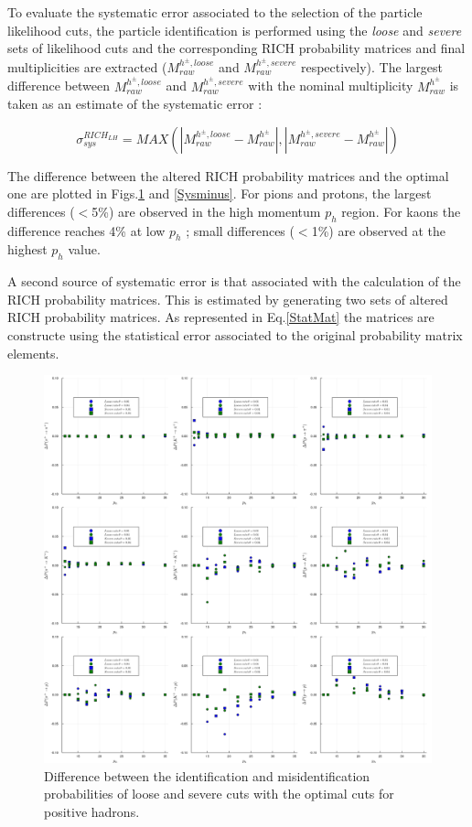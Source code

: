 \documentclass[letterpaper,12pt]{article}
\begin{document}
To evaluate the systematic error associated to the selection of the particle likelihood cuts, the particle identification is performed using the \textit{loose}
and \textit{severe} sets of likelihood cuts and the corresponding RICH probability matrices and final multiplicities are extracted ($M^{h^{\pm},loose}_{raw}$
and $M^{h^{\pm},severe}_{raw}$ respectively). The largest difference between $M^{h^{\pm},loose}_{raw}$ and $M^{h^{\pm},severe}_{raw}$ with the nominal
multiplicity $M^{h^{\pm}}_{raw}$ is taken as an estimate of the systematic error :

\begin{equation}
  \sigma^{RICH_{LH}}_{sys} = MAX(|M^{h^{\pm},loose}_{raw}-M^{h^{\pm}}_{raw}|,|M^{h^{\pm},severe}_{raw}-M^{h^{\pm}}_{raw}|)
\end{equation}

The difference between the altered RICH probability matrices and the optimal one are plotted in Figs.\ref{Sysplus} and \ref{Sysminus}. For pions and protons, the largest differences
($<$5\%) are observed in the high momentum $p_h$ region. For kaons the difference reaches 4\% at low $p_h$ ; small differences ($<$1\%) are observed at the
highest $p_h$ value.

A second source of systematic error is that associated with the calculation of the RICH probability matrices. This is estimated by generating two sets of altered
RICH probability matrices. As represented in Eq.\ref{StatMat} the matrices are constructe using the statistical error associated to the original probability matrix elements.

\begin{figure}[!p]
	\centering
	\includegraphics[scale=0.1]{./gfx/SysPlus.png}
	\caption{Difference between the identification and misidentification probabilities of loose and severe cuts with the optimal cuts for positive hadrons.}
	\label{Sysplus}
\end{figure}
\end{document}
